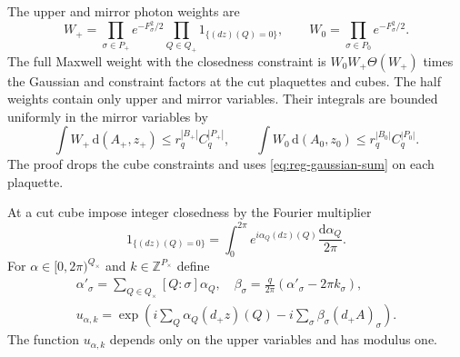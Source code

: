\documentclass[11pt,letterpaper,reqno]{amsart}
\newcommand{\Z}{\mathbb Z}
\newcommand{\dd}{\mathrm d}
\begin{document}
The upper and mirror photon weights are
\begin{equation}\label{eq:reg-half-photon-weights}
 W_+=\prod_{\sigma\in P_+}e^{-F_\sigma^2/2}
               \prod_{Q\in Q_+}1_{\{(dz)(Q)=0\}},
 \qquad W_0=\prod_{\sigma\in P_0}e^{-F_\sigma^2/2}.
\end{equation}
The full Maxwell weight with the closedness constraint is
$W_0W_+\Theta(W_+)$ times the Gaussian and constraint factors at
the cut plaquettes and cubes. The half weights contain only upper
and mirror variables. Their integrals are bounded uniformly in the
mirror variables by
\[
 \int W_+\,\dd(A_+,z_+)
       \le r_q^{|B_+|}C_q^{|P_+|},\qquad
 \int W_0\,\dd(A_0,z_0)
       \le r_q^{|B_0|}C_q^{|P_0|}.
\]
The proof drops the cube constraints and uses
\eqref{eq:reg-gaussian-sum} on each plaquette.

At a cut cube impose integer closedness by the Fourier multiplier
\[
 1_{\{(dz)(Q)=0\}}
   =\int_0^{2\pi}e^{i\alpha_Q(dz)(Q)}\frac{\dd\alpha_Q}{2\pi}.
\]
For $\alpha\in[0,2\pi)^{Q_\times}$ and
$k\in\Z^{P_\times}$ define
\begin{equation}\label{eq:reg-dual-crossing-variables}
 \begin{aligned}
 \alpha'_\sigma=\sum_{Q\in Q_\times}[Q:\sigma]\alpha_Q,
 \quad \beta_\sigma=\frac{q}{2\pi}(\alpha'_\sigma-2\pi k_\sigma),
 \\
 u_{\alpha,k}
 =\exp\left(i\sum_Q\alpha_Q(d_+z)(Q)
                  -i\sum_\sigma\beta_\sigma(d_+A)_\sigma\right).
 \end{aligned}
\end{equation}
The function $u_{\alpha,k}$ depends only on the upper variables and
has modulus one.
\end{document}
